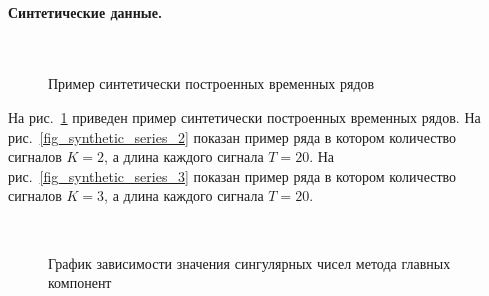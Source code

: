 \documentclass[12pt, twoside]{article}
\begin{document}
\paragraph{Синтетические данные.}

\begin{figure}[h!t]\center
{}
\\
\caption{Пример синтетически построенных временных рядов}
\label{fig_synthetic_series}
\end{figure}

На рис.~\ref{fig_synthetic_series} приведен пример синтетически построенных временных рядов. На рис.~\ref{fig_synthetic_series_2} показан пример ряда в котором количество сигналов $K = 2$, а длина каждого сигнала $T = 20$. На рис.~\ref{fig_synthetic_series_3} показан пример ряда в котором количество сигналов $K = 3$, а длина каждого сигнала $T = 20$. 

\begin{figure}[h!t]\center
{}
\\
\caption{График зависимости значения сингулярных чисел метода главных компонент}
\label{fig_synthetic_lambda}
\end{figure}
\end{document}
